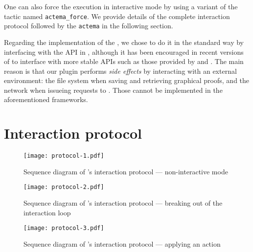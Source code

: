 One can also force the execution in interactive mode by using a variant of the
tactic named \texttt{actema\_force}. We provide details of the complete
interaction protocol followed by the \texttt{actema}  in the following
section.

\AP
Regarding the implementation of the , we chose to do it in the
standard way by interfacing with the  API in 
\cite{CoqCore}, although it has been encouraged in recent versions of 
to interface with more stable APIs such as those provided by 
\cite{CoqELPI} and  . The
main reason is that our plugin performs \emph{side effects} by interacting with
an external environment: the file system when saving and retrieving graphical
proofs, and the network when issueing  requests to . Those
cannot be implemented in the aforementioned frameworks.

\section{Interaction protocol}

\begin{figure*}
  \texttt{[image: protocol-1.pdf]}
  \vspace{2em}
  \caption{Sequence diagram of 's interaction protocol ---
  non-interactive mode}
\end{figure*}

\begin{figure*}
  \texttt{[image: protocol-2.pdf]}
  \vspace{2em}
  \caption{Sequence diagram of 's interaction protocol ---
    breaking out of the interaction loop}
\end{figure*}

\begin{figure*}
  \texttt{[image: protocol-3.pdf]}
  \vspace{2em}
  \caption{Sequence diagram of 's interaction protocol ---
    applying an action}
\end{figure*}

